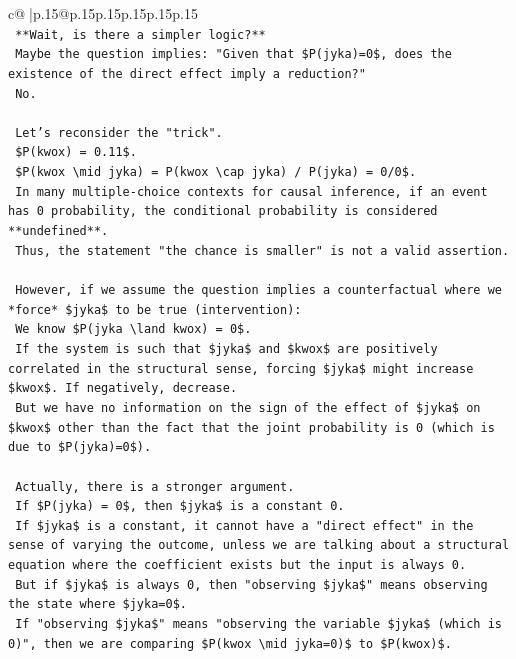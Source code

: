 \documentclass{article}
\begin{document}
{\begin{supertabular}{c@{$\;$}|p{.15\linewidth}@{}p{.15\linewidth}p{.15\linewidth}p{.15\linewidth}p{.15\linewidth}p{.15\linewidth}}
{{{\\ 
\texttt{        **Wait, is there a simpler logic?**} \\
\texttt{        Maybe the question implies: "Given that \$P(jyka)=0\$, does the existence of the direct effect imply a reduction?"} \\
\texttt{        No.} \\
\\ 
\texttt{        Let's reconsider the "trick".} \\
\texttt{        \$P(kwox) = 0.11\$.} \\
\texttt{        \$P(kwox \textbackslash{}mid jyka) = P(kwox \textbackslash{}cap jyka) / P(jyka) = 0/0\$.} \\
\texttt{        In many multiple{-}choice contexts for causal inference, if an event has 0 probability, the conditional probability is considered **undefined**.} \\
\texttt{        Thus, the statement "the chance is smaller" is not a valid assertion.} \\
\\ 
\texttt{        However, if we assume the question implies a counterfactual where we *force* \$jyka\$ to be true (intervention):} \\
\texttt{        We know \$P(jyka \textbackslash{}land kwox) = 0\$.} \\
\texttt{        If the system is such that \$jyka\$ and \$kwox\$ are positively correlated in the structural sense, forcing \$jyka\$ might increase \$kwox\$. If negatively, decrease.} \\
\texttt{        But we have no information on the sign of the effect of \$jyka\$ on \$kwox\$ other than the fact that the joint probability is 0 (which is due to \$P(jyka)=0\$).} \\
\\ 
\texttt{        Actually, there is a stronger argument.} \\
\texttt{        If \$P(jyka) = 0\$, then \$jyka\$ is a constant 0.} \\
\texttt{        If \$jyka\$ is a constant, it cannot have a "direct effect" in the sense of varying the outcome, unless we are talking about a structural equation where the coefficient exists but the input is always 0.} \\
\texttt{        But if \$jyka\$ is always 0, then "observing \$jyka\$" means observing the state where \$jyka=0\$.} \\
\texttt{        If "observing \$jyka\$" means "observing the variable \$jyka\$ (which is 0)", then we are comparing \$P(kwox \textbackslash{}mid jyka=0)\$ to \$P(kwox)\$.} \\
}}}
\end{supertabular}}
\end{document}
